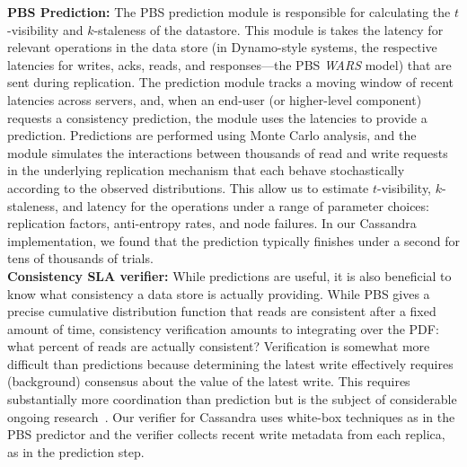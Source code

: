 \textbf{PBS Prediction:} The PBS prediction module is responsible for
calculating the $t$-visibility and $k$-staleness of the
datastore. This module is takes the latency for relevant operations in
the data store (in Dynamo-style systems, the respective latencies for
writes, acks, reads, and responses---the PBS \textit{WARS} model) that
are sent during replication.  The prediction module tracks a moving
window of recent latencies across servers, and, when an end-user (or
higher-level component) requests a consistency prediction, the module
uses the latencies to provide a prediction. Predictions are performed
using Monte Carlo analysis, and the module simulates the interactions
between thousands of read and write requests in the underlying
replication mechanism that each behave stochastically according to the
observed distributions. This allow us to estimate $t$-visibility,
$k$-staleness, and latency for the operations under a range of
parameter choices: replication factors, anti-entropy rates, and node
failures. In our Cassandra implementation, we found that the
prediction typically finishes under a second for tens of thousands of
trials.\\



\textbf{Consistency SLA verifier:} While predictions are useful, it is
also beneficial to know what consistency a data store is actually
providing. While PBS gives a precise cumulative distribution function
that reads are consistent after a fixed amount of time, consistency
verification amounts to integrating over the PDF: what percent of
reads are actually consistent? Verification is somewhat more difficult
than predictions because determining the latest write effectively
requires (background) consensus about the value of the latest
write. This requires substantially more coordination than prediction
but is the subject of considerable ongoing
research~\cite{podc-hpl}. Our verifier for Cassandra uses white-box
techniques as in the PBS predictor and the verifier collects recent
write metadata from each replica, as in the prediction step.

